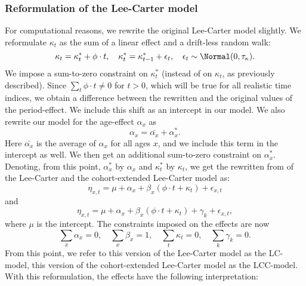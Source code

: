 \subsubsection{Reformulation of the Lee-Carter model}
For computational reasons, we rewrite the original Lee-Carter model slightly. We reformulate $\kappa_t$ as the sum of a linear effect and a drift-less random walk:
\begin{equation}
    \kappa_t = \kappa_t^* + \phi\cdot t, \quad \kappa_t^* = \kappa_{t-1}^* + \epsilon_t, \quad \epsilon_t \sim \Normal(0,\tau_{\kappa}).
\end{equation}
We impose a sum-to-zero constraint on $\kappa_t^*$ (instead of on $\kappa_t$, as previously described). Since $\sum_t \phi \cdot t \neq 0$ for $t > 0$, which will be true for all realistic time indices, we obtain a difference between the rewritten and the original values of the period-effect. We include this shift as an intercept in our model. We also rewrite our model for the age-effect $\alpha_x$ as 
\begin{equation}
    \alpha_x = \bar{\alpha_x} + \alpha_x^*.
\end{equation}
Here $\bar{\alpha_x}$ is the average of $\alpha_x$ for all ages $x$, and we include this term in the intercept as well. We then get an additional sum-to-zero constraint on $\alpha_x^*$. Denoting, from this point, $\alpha_x^*$ by $\alpha_x$ and $\kappa_t^*$ by $\kappa_t$, we get the rewritten from of the Lee-Carter and the cohort-extended Lee-Carter model as:
\begin{equation}
    \eta_{x,t} = \mu + \alpha_x + \beta_x(\phi \cdot t + \kappa_t) + \epsilon_{x,t}
    \label{eq:LC-rewritten}
\end{equation}
and
\begin{equation}
    \eta_{x,t} = \mu + \alpha_x + \beta_x(\phi \cdot t + \kappa_t) + \gamma_k + \epsilon_{x,t},
    \label{eq:LCC-rewritten}
\end{equation}
where $\mu$ is the intercept. The constraints imposed on the effects are now
\begin{equation}
    \sum_x \alpha_x = 0, \quad \sum_x \beta_x = 1, \quad \sum_t \kappa_t = 0,\quad \sum_k \gamma_k = 0. 
    \label{eq:LCconstraintsFinal}
\end{equation}
From this point, we refer to this version of the Lee-Carter model as the LC-model, this version of the cohort-extended Lee-Carter model as the LCC-model. With this reformulation, the effects have the following interpretation:
